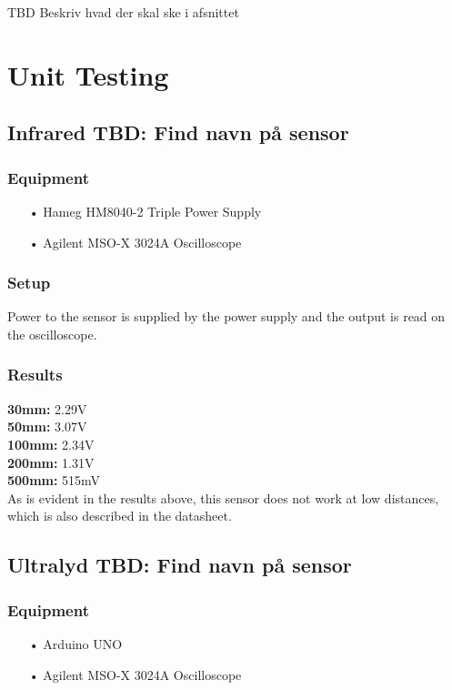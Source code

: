 TBD
Beskriv hvad der skal ske i afsnittet
\section{Unit Testing}

\subsection{Infrared TBD: Find navn på sensor}


\subsubsection{Equipment}
\begin{enumerate}
    \item[•]Hameg HM8040-2 Triple Power Supply
    \item[•]Agilent MSO-X 3024A Oscilloscope    
\end{enumerate}

\subsubsection{Setup}
Power to the sensor is supplied by the power supply and the output is read on the oscilloscope.

\subsubsection{Results}
\textbf{30mm:}  2.29V\\
\textbf{50mm:}  3.07V\\
\textbf{100mm:} 2.34V\\
\textbf{200mm:} 1.31V\\
\textbf{500mm:} 515mV\\

As is evident in the results above, this sensor does not work at low distances, which is also described in the datasheet.

\subsection{Ultralyd TBD: Find navn på sensor}


\subsubsection{Equipment}
\begin{enumerate}
    \item[•]Arduino UNO
    \item[•]Agilent MSO-X 3024A Oscilloscope    
\end{enumerate}

